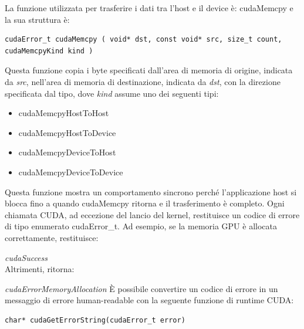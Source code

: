 La funzione utilizzata per trasferire i dati tra l'host e il device è: cudaMemcpy e la sua struttura è:
\begin{lstlisting}[label=code:cudaMemcpy_def]
cudaError_t cudaMemcpy ( void* dst, const void* src, size_t count, cudaMemcpyKind kind )
\end{lstlisting}
Questa funzione copia i byte specificati dall'area di memoria di origine, indicata da \emph{src}, nell'area di memoria di destinazione, indicata da \emph{dst}, con la direzione specificata dal tipo, dove \emph{kind} assume uno dei seguenti tipi:
\begin{itemize}
	\item cudaMemcpyHostToHost
	\item cudaMemcpyHostToDevice
	\item cudaMemcpyDeviceToHost
	\item cudaMemcpyDeviceToDevice
\end{itemize}
Questa funzione mostra un comportamento sincrono perché l'applicazione host si blocca fino a quando cudaMemcpy ritorna e il trasferimento è completo. Ogni chiamata CUDA, ad eccezione del lancio del kernel, restituisce un codice di errore di tipo enumerato cudaError\_t. Ad esempio, se la memoria GPU è allocata correttamente, restituisce:

\textit{cudaSuccess}\\
Altrimenti, ritorna:

\textit{cudaErrorMemoryAllocation}
È possibile convertire un codice di errore in un messaggio di errore human-readable con la seguente funzione di runtime CUDA:
\begin{lstlisting}[label=code:cudaGetErrorString_def]
char* cudaGetErrorString(cudaError_t error)
\end{lstlisting}

